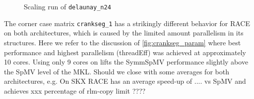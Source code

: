   \begin{figure}[thbp]
  	\centering
  	\caption{Scaling run of \texttt{delaunay\_n24}}
  	\label{fig:scaling_delaunay}
  \end{figure}
The corner case matrix \texttt{crankseg\_1} has a strikingly different behavior for \acrshort{RACE} on both architectures, which is caused by the limited amount parallelism in its structures. Here we refer to the discussion of \cref{fig:crankseg_param} where best performance and highest parallelism (\acrshort{threadEff}) was achieved at approximately 10 cores. Using only 9 cores on \SKX lifts the \acrshort{SymmSpMV} performance slightly above the \acrshort{SpMV} level of the MKL. 
%
{\GW Should we close with some averages for both architectures, e.g. On SKX RACE has an average speed-up of .... vs SpMV and achieves xxx percentage of rlm-copy limit ????} 
%
%
